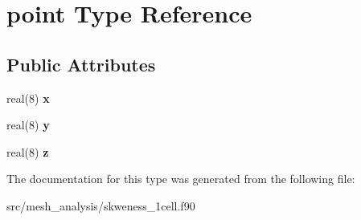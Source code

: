 \hypertarget{structpoint}{}\section{point Type Reference}
\label{structpoint}
\subsection*{Public Attributes}
\begin{DoxyCompactItemize}
\item 
\mbox{\label{structpoint_a951eb781c58e648afe164ee12c8f8183}} 
real(8) {\bfseries x}
\item 
\mbox{\label{structpoint_a2e82bc57503da71cc5be625828d18ca1}} 
real(8) {\bfseries y}
\item 
\mbox{\label{structpoint_aea3f5f7b2b2afbf7f9d828b8b52ea82a}} 
real(8) {\bfseries z}
\end{DoxyCompactItemize}


The documentation for this type was generated from the following file\+:\begin{DoxyCompactItemize}
\item 
src/mesh\+\_\+analysis/skweness\+\_\+1cell.\+f90\end{DoxyCompactItemize}
